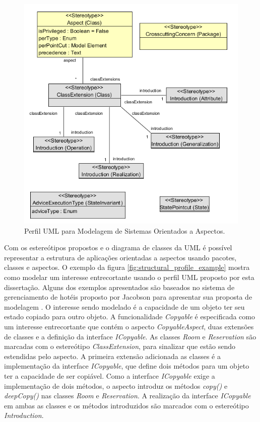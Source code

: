 \begin{figure}[!h] \centering
	\includegraphics{img/full_profile.png}
	\caption{Perfil UML para Modelagem de Sistemas Orientados a Aspectos.}\label{fig:uml_profile}
\end{figure}

Com os estereótipos propostos e o diagrama de classes da UML é possível representar a estrutura de aplicações orientadas a aspectos usando
pacotes, classes e aspectos. O exemplo da figura \ref{fig:structural_profile_example} mostra como modelar um interesse entrecortante usando o perfil
UML proposto por esta dissertação. Alguns dos exemplos apresentados são baseados no sistema de gerenciamento de hotéis proposto por Jacobson para
apresentar sua proposta de modelagem \cite{Jacobson:2004:ASD:1062430}. O interesse sendo modelado é a capacidade de um objeto ter seu estado copiado
para outro objeto. A funcionalidade \textit{Copyable} é especificada como um interesse entrecortante que contém o aspecto
\textit{CopyableAspect}, duas extensões de classes e a definição da interface \textit{ICopyable}. As classes \textit{Room} e \textit{Reservation}
são marcadas com o estereótipo \textit{ClassExtension}, para sinalizar que estão sendo estendidas pelo aspecto. A primeira extensão adicionada as
classes é a implementação da interface \textit{ICopyable}, que define dois métodos para um objeto ter a capacidade de ser copiável. Como a interface
\textit{ICopyable} exige a implementação de dois métodos, o aspecto introduz os métodos \textit{copy()} e \textit{deepCopy()} nas classes \textit{Room} e \textit{Reservation}. 
A realização da interface \textit{ICopyable} em ambas as classes e os métodos introduzidos são marcados com o estereótipo \textit{Introduction}.

